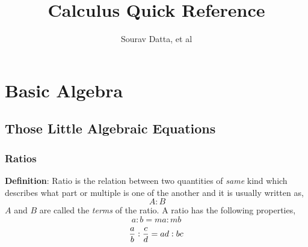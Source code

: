 \documentclass[a4paper]{book}
\title{\LARGE{Calculus Quick Reference}}
\author{Sourav Datta, et al}
\date{}
\begin{document}
\maketitle

\tableofcontents

\part{Basic Algebra}

\chapter{Those Little Algebraic Equations}
\section{Ratios}
\textbf{Definition}: Ratio is the relation between two quantities of \textit{same} kind which describes what part or multiple is one of the another and it is usually written as,
\[ \  A : B \]
$A$ and $B$ are called the \textit{terms} of the ratio. 
A ratio has the following properties,
\[ a:b=ma:mb \]
\[ {a \over b}:{c \over d} = {ad:bc} \]
\end{document}
